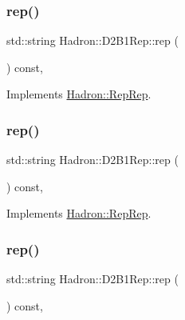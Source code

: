 \subsubsection{\texorpdfstring{rep()}{rep()}\hspace{0.1cm}{\footnotesize\ttfamily [3/5]}}
{\footnotesize\ttfamily std\+::string Hadron\+::\+D2\+B1\+Rep\+::rep (\begin{DoxyParamCaption}{ }\end{DoxyParamCaption}) const\hspace{0.3cm}{\ttfamily [inline]}, {\ttfamily [virtual]}}



Implements \mbox{\hyperlink{structHadron_1_1RepRep_ab3213025f6de249f7095892109575fde}{Hadron\+::\+Rep\+Rep}}.

\mbox{\label{structHadron_1_1D2B1Rep_a7ff8b1fc65d3414195a7788bc220b1c0}} 
\subsubsection{\texorpdfstring{rep()}{rep()}\hspace{0.1cm}{\footnotesize\ttfamily [4/5]}}
{\footnotesize\ttfamily std\+::string Hadron\+::\+D2\+B1\+Rep\+::rep (\begin{DoxyParamCaption}{ }\end{DoxyParamCaption}) const\hspace{0.3cm}{\ttfamily [inline]}, {\ttfamily [virtual]}}



Implements \mbox{\hyperlink{structHadron_1_1RepRep_ab3213025f6de249f7095892109575fde}{Hadron\+::\+Rep\+Rep}}.

\mbox{\label{structHadron_1_1D2B1Rep_a7ff8b1fc65d3414195a7788bc220b1c0}} 
\subsubsection{\texorpdfstring{rep()}{rep()}\hspace{0.1cm}{\footnotesize\ttfamily [5/5]}}
{\footnotesize\ttfamily std\+::string Hadron\+::\+D2\+B1\+Rep\+::rep (\begin{DoxyParamCaption}{ }\end{DoxyParamCaption}) const\hspace{0.3cm}{\ttfamily [inline]}, {\ttfamily [virtual]}}



